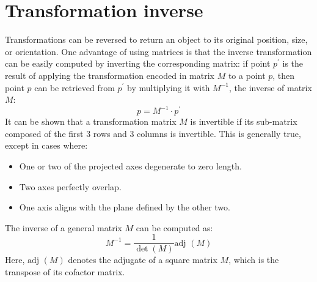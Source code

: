 \section{Transformation inverse}

Transformations can be reversed to return an object to its original position, size, or orientation. 
One advantage of using matrices is that the inverse transformation can be easily computed by inverting the corresponding matrix: if point $p^\prime$ is the result of applying the transformation encoded in matrix $M$ to a point $p$, then point $p$ can be retrieved from $p^\prime$ by multiplying it with $M^{-1}$, the inverse of matrix $M$:
\[p=M^{-1} \cdot p^\prime\]
It can be shown that a transformation matrix $M$ is invertible if its sub-matrix composed of the first 3 rows and 3 columns is invertible. 
This is generally true, except in cases where:
\begin{itemize}
    \item One or two of the projected axes degenerate to zero length.
    \item Two axes perfectly overlap.
    \item One axis aligns with the plane defined by the other two.
\end{itemize}

The inverse of a general matrix $M$ can be computed as:
\[M^{-1}=\dfrac{1}{\det{(M)}}\text{adj }(M)\]
Here, $\text{adj }(M)$ denotes the adjugate of a square matrix $M$, which is the transpose of its cofactor matrix.

